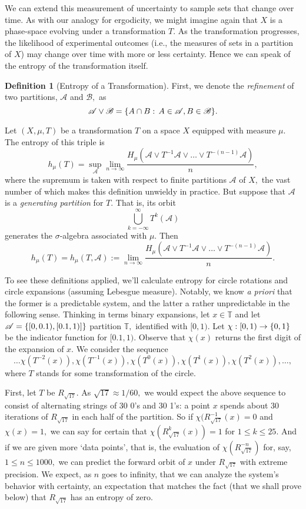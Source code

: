 \documentclass[12pt, letterpaper, oneside]{book}
\newcommand{\gs}{\ensuremath{\sigma}}
\newcommand{\T}{\mathbb{T}}
\DeclarePairedDelimiter{\set}{\lbrace}{\rbrace}
\theoremstyle{plain}
\theoremstyle{definition}
\newtheorem{definition}{Definition}
\theoremstyle{remark}
\begin{document}
We can extend this measurement of uncertainty to sample sets that change over time. As with our analogy for ergodicity, we might imagine  again that $X$ is a phase-space evolving under a transformation $T.$ As the transformation progresses, the likelihood of experimental outcomes (i.e., the measures of sets in a partition of $X$) may change over time with more or less certainty. Hence we can speak of the entropy of the transformation itself.

\begin{definition}[Entropy of a Transformation]

First, we denote the \textit{refinement} of two partitions, $\mathscr{A}$ and $\mathscr{B},$ as 
\[
\mathscr{A} \lor \mathscr{B} = \set{A \cap B:\,A \in \mathscr{A},B \in \mathscr{B}}.
\]

Let $(X,\mu, T)$ be a transformation $T$ on a space $X$ equipped with measure $\mu.$ The entropy of this triple is
\[
h_\mu(T) = \sup_\mathscr{A} \lim _{n \to \infty} \frac{H_\mu (\mathscr{A} \lor T^{-1}\mathscr{A} \lor \ldots \lor T^{-(n-1)}\mathscr{A})}{n},
\]
where the supremum is taken with respect to finite partitions $\mathscr{A}$ of $X,$ the vast number of which makes this definition unwieldy in practice. But suppose that $\mathscr{A}$ is a \textit{generating partition} for $T.$ That is, its orbit
\[
\bigcup_{k = -\infty}^\infty T^k(\mathscr{A})
\]
generates the $\gs$-algebra associated with $\mu.$ Then
\[
h_\mu(T) = h_\mu(T, \mathcal{A}) := \lim_{n \to \infty} \frac{H_\mu (\mathscr{A} \lor T^{-1}\mathscr{A} \lor \ldots \lor T^{-(n-1)}\mathscr{A})}{n}.
\]
\end{definition}

To see these definitions applied, we'll calculate entropy for circle rotations and circle expansions (assuming Lebesgue measure). Notably, we know \textit{a priori} that the former is a predictable system, and the latter a rather unpredictable in the following sense. Thinking in terms binary expansions, let $x \in \T$ and let $\mathscr{A} = \set{[0, 0.1), [0.1, 1)]}$ partition  $\T,$ identified with $[0,1).$ Let $\chi: [0,1) \to \set{0,1}$ be the indicator function for $[0.1, 1).$ Observe that $\chi (x)$ returns the first digit of the expansion of $x.$ We consider the sequence
\[
\ldots \chi(T^{-2}(x)), \chi(T^{-1}(x)), \chi(T^{0}(x)), \chi(T^{1}(x)), \chi(T^{2}(x)), \ldots,
\]
where $T$ stands for some transformation of the circle. 

First, let $T$ be $R_{\sqrt{17}}.$  As $\sqrt{17} \approx 1/60,$  we would expect the above sequence to consist of alternating strings of 30 0's and 30 1's: a point $x$ spends about 30 iterations of $R_{\sqrt{17}}$ in each half of the partition. So if $\chi(R_{\sqrt{17}}^{-1}(x) = 0$ and $\chi(x) = 1,$ we can say for certain that $\chi(R_{\sqrt{17}}^k(x)) = 1$ for $1 \leq k \leq 25.$ And if we are given more `data points', that is, the evaluation of $\chi(R_{\sqrt{17}}^{-n})$ for, say, $1 \leq n \leq 1000,$ we can predict the forward orbit of $x$ under $R_{\sqrt{17}}$ with extreme precision. We expect, as $n$ goes to infinity, that we can analyze the system's behavior with certainty, an expectation that matches the fact (that we shall prove below) that $R_{\sqrt{17}}$ has an entropy of zero. 
\end{document}
